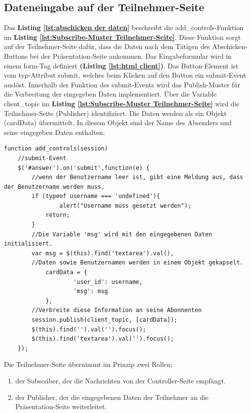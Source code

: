 \subsection{Dateneingabe auf der Teilnehmer-Seite}
\label{subsec:Dateneingabe auf der Teilnehmer-Seite}
Das \textbf{Listing \ref{lst:abschicken der daten}} beschreibt die \glqq add\_controls\grqq{}-Funktion im \textbf{Listing \ref{lst:Subscribe-Muster Teilnehmer-Seite}}. Diese Funktion sorgt auf der Teilnehmer-Seite dafür, dass die Daten nach dem Tätigen des Abschicken-Buttons bei der Präsentation-Seite ankommen. Das Eingabeformular wird in einem form-Tag definiert \textbf{(Listing \ref{lst:html client})}. Das Button-Element ist vom typ-Attribut \glqq submit\grqq{}, welches beim Klicken auf den Button ein submit-Event auslöst. Innerhalb der Funktion des submit-Events wird das Publish-Muster für die Verbreitung der eingegeben Daten implementiert. Über die Variable \glqq client\_topic\grqq{} im \textbf{Listing \ref{lst:Subscribe-Muster Teilnehmer-Seite}} wird die Teilnehmer-Seite (Publisher) identifiziert. Die Daten werden als ein Objekt (cardData) übermittelt. In diesem Objekt sind der Name des Absenders und seine eingegeben Daten enthalten. \bigskip

\begin{lstlisting}[caption={Funktion für das Abschicken von Daten auf der Teilnehmer-Seite - JavaScript}, label=lst:abschicken der daten, captionpos=b]
function add_controls(session)
	//submit-Event
	$('#answer').on('submit',function(e) {
		//wenn der Benutzername leer ist, gibt eine Meldung aus, dass der Benutzername werden muss.
		if (typeof username === 'undefined'){
        		alert("Username muss gesetzt werden");
            return;
   		}
		//Die Variable 'msg' wird mit den eingegebenen Daten initialisiert.
		var msg = $(this).find('textarea').val(),
		//Daten sowie Benutzernamen werden in einem Objekt gekapselt.
			cardData = {
            		'user_id': username,
            		'msg': msg
            },
		//Verbreite diese Information an seine Abonnenten
		session.publish(client_topic, [cardData]);
		$(this).find('').val('').focus();
		$(this).find('textarea').val('').focus();
	});
\end{lstlisting}

Die Teilnehmer-Seite übernimmt im Prinzip zwei Rollen:
\begin{enumerate}
\item der Subscriber, der die Nachrichten von der Controller-Seite empfängt.
\item der Publisher, der die eingegebenen Daten der Teilnehmer an die Präsentation-Seite weiterleitet.
\end{enumerate}

